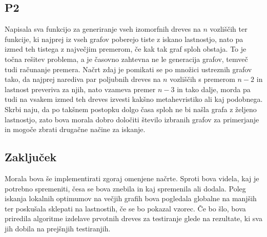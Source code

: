 \documentclass[a4paper, 12 pt]{article}
\begin{document}
{\subsection{P2}
Napisala sva funkcijo za generiranje vseh izomorfnih dreves na $n$ vozliščih ter funkcije, ki najprej iz vseh grafov poberejo tiste z iskano lastnostjo, nato pa izmed teh tistega z največjim premerom, če kak tak graf sploh obstaja. To je točna rešitev problema, a je časovno zahtevna ne le generacija grafov, temveč tudi računanje premera. Načrt zdaj je pomikati se po množici ustreznih grafov tako, da najprej narediva par poljubnih dreves na $n$ vozliščih s premerom $n - 2$ in lastnost preveriva za njih, nato vzameva premer $n - 3$ in tako dalje, morda pa tudi na vsakem izmed teh dreves izvesti kakšno metahevristiko ali kaj podobnega. Skrbi naju, da po takšnem postopku dolgo časa sploh ne bi našla grafa z željeno lastnostjo, zato bova morala dobro določiti število izbranih grafov za primerjanje in mogoče zbrati drugačne načine za iskanje.

\subsection{Zaključek}

Morala bova še implementirati zgoraj omenjene načrte. Sproti bova videla, kaj je potrebno spremeniti, česa se bova znebila in kaj spremenila ali dodala. Poleg iskanja lokalnih optimumov na večjih grafih bova pogledala globalne na manjših ter poskušala sklepati na lastnostih, če se bo pokazal vzorec. Če bo šlo, bova priredila algoritme izdelave prvotnih dreves za testiranje glede na rezultate, ki sva jih dobila na prejšnjih testiranjih.}
\end{document}

